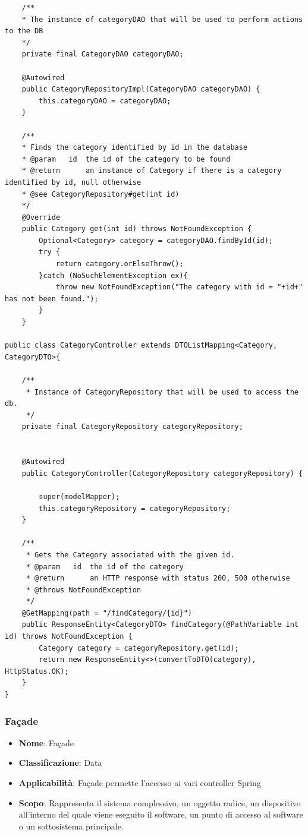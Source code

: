 \documentclass[12pt]{article}
\begin{document}
\begin{itemize}
\begin{lstlisting}
	/**
	* The instance of categoryDAO that will be used to perform actions to the DB
	*/
	private final CategoryDAO categoryDAO;
	
	@Autowired
	public CategoryRepositoryImpl(CategoryDAO categoryDAO) {
		this.categoryDAO = categoryDAO;
	}
	
	/**
	* Finds the category identified by id in the database
	* @param   id  the id of the category to be found
	* @return      an instance of Category if there is a category identified by id, null otherwise
	* @see CategoryRepository#get(int id)
	*/
	@Override
	public Category get(int id) throws NotFoundException {
		Optional<Category> category = categoryDAO.findById(id);
		try {
			return category.orElseThrow();
		}catch (NoSuchElementException ex){
			throw new NotFoundException("The category with id = "+id+" has not been found.");
		}
	}

public class CategoryController extends DTOListMapping<Category, CategoryDTO>{

    /**
     * Instance of CategoryRepository that will be used to access the db.
     */
    private final CategoryRepository categoryRepository;


    @Autowired
    public CategoryController(CategoryRepository categoryRepository) {

        super(modelMapper);
        this.categoryRepository = categoryRepository;
    }

    /**
     * Gets the Category associated with the given id.
     * @param	id	the id of the category
     * @return		an HTTP response with status 200, 500 otherwise
     * @throws NotFoundException 
     */
    @GetMapping(path = "/findCategory/{id}")
    public ResponseEntity<CategoryDTO> findCategory(@PathVariable int id) throws NotFoundException {
        Category category = categoryRepository.get(id);
        return new ResponseEntity<>(convertToDTO(category), HttpStatus.OK);
    }
}
            \end{lstlisting}
        \end{itemize}
		
		\subsubsection{Façade}
		\begin{itemize}
		\item \textbf{Nome}: Façade
            \item \textbf{Classificazione}: Data
            \item \textbf{Applicabilità}: Façade permette l'accesso ai vari controller Spring
            \item \textbf{Scopo}: Rappresenta il sistema complessivo, un oggetto radice, un dispositivo all’interno del quale viene eseguito il software, un punto di accesso al software o un sottosistema principale.
        \end{itemize}
	
\end{document}
